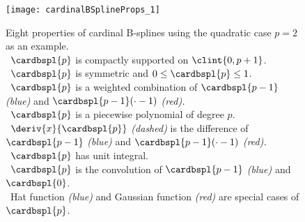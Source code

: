 \begin{figure}
  \texttt{[image: cardinalBSplineProps\_1]}%
  \caption[%
    Properties of cardinal B-splines%
  ]{%
    Eight properties of cardinal B-splines using the quadratic case
    $p = 2$ as an example.\\
    \,
    $\cardbspl{p}$ is compactly supported on $\clint{0, p+1}$.\\
    \,
    $\cardbspl{p}$ is symmetric and $0 \le \cardbspl{p} \le 1$.\\
    \,
    $\cardbspl{p}$ is a weighted combination of
    $\cardbspl{p-1}$ \emph{\textcolor{C0}{(blue)}} and
    $\cardbspl{p-1}({\cdot} - 1)$ \emph{\textcolor{C1}{(red)}.}\\
    \,
    $\cardbspl{p}$ is a piecewise polynomial of degree $p$.\\
    \,
    $\deriv{x}{\cardbspl{p}}$ \emph{(dashed)}
    is the difference of
    $\cardbspl{p-1}$ \emph{\textcolor{C0}{(blue)}} and
    $\cardbspl{p-1}({\cdot} - 1)$ \emph{\textcolor{C1}{(red)}.}\\
    \,
    $\cardbspl{p}$ has unit integral.\\
    \,
    $\cardbspl{p}$ is the convolution of
    $\cardbspl{p-1}$ \emph{\textcolor{C0}{(blue)}} and $\cardbspl{0}$.\\
    \,
    Hat function \emph{\textcolor{C0}{(blue)}} and
    Gaussian function \emph{\textcolor{C1}{(red)}}
    are special cases of $\cardbspl{p}$.%
  }%
  \label{fig:cardinalBSplineProps}%
\end{figure}

